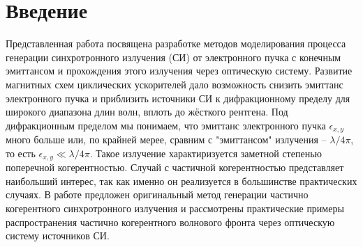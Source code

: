 \chapter*{Введение}							%

\newcommand{\actuality}{}
\newcommand{\aim}{\textbf{Целью}}
\newcommand{\tasks}{задачи}
\newcommand{\defpositions}{\textbf{Основные положения, выносимые на~защиту:}}
\newcommand{\novelty}{\textbf{Научная новизна}}
\newcommand{\influence}{\textbf{Научная и практическая значимость}}
\newcommand{\reliability}{\textbf{Степень достоверности}}
\newcommand{\probation}{\textbf{Апробация работы.}}
\newcommand{\contribution}{\textbf{Личный вклад.}}
\newcommand{\publications}{\textbf{Публикации.}}



%
Представленная работа посвящена разработке методов моделирования процесса генерации синхротронного излучения (СИ) от электронного пучка с конечным эмиттансом и прохождения этого излучения через оптическую систему. Развитие магнитных схем циклических ускорителей дало возможность снизить эмиттанс электронного пучка и приблизить источники СИ к дифракционному пределу для широкого диапазона длин волн, вплоть до жёсткого рентгена. Под дифракционным пределом мы понимаем, что эмиттанс электронного пучка $\epsilon_{x, y}$ много больше или, по крайней мерее, сравним с "эмиттансом" излучения -- $\lambda/4\pi$, то есть  $\epsilon_{x, y} \ll \lambda/4\pi$. Такое излучение характиризуется заметной степенью поперечной когерентностью. Случай с частичной когерентностью представляет наибольший интерес, так как именно он реализуется в большинстве практических случаях. В работе предложен оригинальный метод генерации частично когерентного синхротронного излучения и рассмотрены практические примеры распространения частично когерентного волнового фронта через оптическую систему источников СИ.



